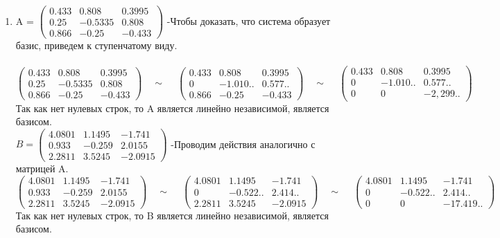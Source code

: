 \begin{enumerate}
    \item 
        A = $\begin{pmatrix} 0.433 & 0.808 & 0.3995 \\ 0.25 & -0.5335 & 0.808 \\ 0.866 & -0.25 & -0.433\end{pmatrix}$ \quad-\quad Чтобы доказать, что система образует базис, приведем к ступенчатому виду. \\\\
        $\begin{pmatrix} 0.433 & 0.808 & 0.3995 \\ 0.25 & -0.5335 & 0.808 \\ 0.866 & -0.25 & -0.433\end{pmatrix} \quad\sim\quad\ 
        \begin{pmatrix} 0.433 & 0.808 & 0.3995 \\ 0 & -1.010.. & 0.577.. \\ 0.866 & -0.25 & -0.433\end{pmatrix}
        \quad\sim\quad\ 
        \begin{pmatrix} 0.433 & 0.808 & 0.3995 \\ 0 & -1.010.. & 0.577.. \\ 0 & 0 & -2,299..\end{pmatrix}
        $\\
        Так как нет нулевых строк, то A является линейно независимой, является базисом.\\
        
        $B = \begin{pmatrix} 4.0801 & 1.1495 & -1.741 \\ 0.933 & -0.259 & 2.0155 \\ 2.2811 & 3.5245 & -2.0915\end{pmatrix}$ \quad-\quad Проводим действия аналогично с матрицей A.\\
        $\begin{pmatrix} 4.0801 & 1.1495 & -1.741 \\ 0.933 & -0.259 & 2.0155 \\ 2.2811 & 3.5245 & -2.0915\end{pmatrix}
        \quad\sim\quad\
        \begin{pmatrix} 4.0801 & 1.1495 & -1.741 \\ 0 & -0.522.. & 2.414.. \\ 2.2811 & 3.5245 & -2.0915\end{pmatrix}
        \quad\sim\quad\ 
        \begin{pmatrix} 4.0801 & 1.1495 & -1.741 \\ 0 & -0.522.. & 2.414.. \\ 0 & 0 & -17.419..\end{pmatrix}
        $\\
        Так как нет нулевых строк, то B является линейно независимой, является базисом.\\


\end{enumerate}
